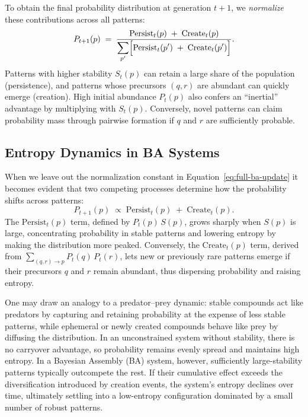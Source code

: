 \documentclass[entropy,article,submit,pdftex,moreauthors]{Definitions/mdpi}
\begin{document}
To obtain the final probability distribution at generation \(t+1\), we \emph{normalize} these contributions across all patterns:
\begin{equation}
\label{eq:full-ba-update}
P_{t+1}(p)
\;=\;
\frac{
  \mathrm{Persist}_t(p)
  \;+\;
  \mathrm{Create}_t(p)
}{
  \displaystyle \sum_{p'} 
  \Bigl[
    \mathrm{Persist}_t(p')
    \;+\;
    \mathrm{Create}_t(p')
  \Bigr]
}.
\end{equation}
Patterns with higher stability \(S_t(p)\) can retain a large share of the population (persistence), and patterns whose precursors \((q,r)\) are abundant can quickly emerge (creation). High initial abundance \(P_t(p)\) also confers an “inertial” advantage by multiplying with \(S_t(p)\). Conversely, novel patterns can claim probability mass through pairwise formation if \(q\) and \(r\) are sufficiently probable.

\subsection{Entropy Dynamics in BA Systems}

When we leave out the normalization constant in Equation~\ref{eq:full-ba-update} it becomes evident that two competing processes determine how the probability shifts across patterns:
\[
P_{t+1}(p) \;\propto\; \mathrm{Persist}_t(p) \;+\; \mathrm{Create}_t(p).
\]
The $\mathrm{Persist}_t(p)$ term, defined by $P_t(p)\,S(p)$, grows sharply when $S(p)$ is large, concentrating probability in stable patterns and lowering entropy by making the distribution more peaked. Conversely, the $\mathrm{Create}_t(p)$ term, derived from $\sum_{(q,r)\to p}P_t(q)\,P_t(r)$, lets new or previously rare patterns emerge if their precursors $q$ and $r$ remain abundant, thus dispersing probability and raising entropy.

One may draw an analogy to a predator–prey dynamic: stable compounds act like predators by capturing and retaining probability at the expense of less stable patterns, while ephemeral or newly created compounds behave like prey by diffusing the distribution. In an unconstrained system without stability, there is no carryover advantage, so probability remains evenly spread and maintains high entropy. In a Bayesian Assembly (BA) system, however, sufficiently large-stability patterns typically outcompete the rest. If their cumulative effect exceeds the diversification introduced by creation events, the system’s entropy declines over time, ultimately settling into a low-entropy configuration dominated by a small number of robust patterns.
\end{document}
